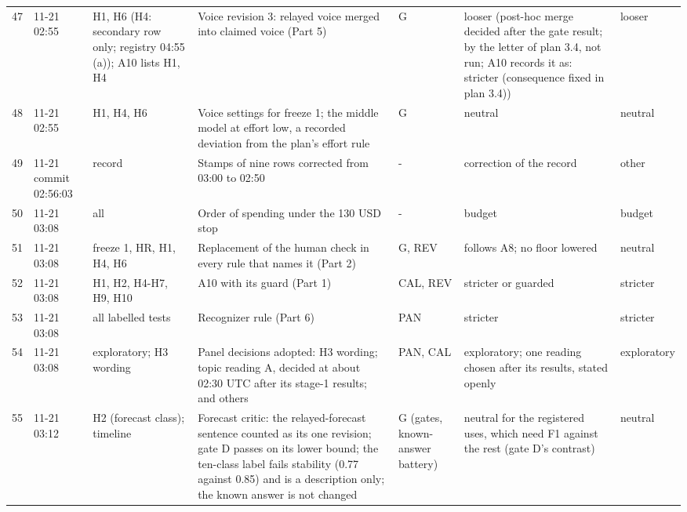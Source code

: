{\begin{tabular}{@{}rp{}p{}p{}p{}p{}l@{}}
47 & 11-21 02:55 & H1, H6 (H4: secondary row only; registry 04:55 (a)); A10 lists H1, H4 & Voice revision 3: relayed voice merged into claimed voice (Part 5) & G & looser (post-hoc merge decided after the gate result; by the letter of plan 3.4, not run; A10 records it as: stricter (consequence fixed in plan 3.4)) & looser \\
48 & 11-21 02:55 & H1, H4, H6 & Voice settings for freeze 1; the middle model at effort low, a recorded deviation from the plan's effort rule & G & neutral & neutral \\
49 & 11-21 commit 02:56:03 & record & Stamps of nine rows corrected from 03:00 to 02:50 & - & correction of the record & other \\
50 & 11-21 03:08 & all & Order of spending under the 130 USD stop & - & budget & budget \\
51 & 11-21 03:08 & freeze 1, HR, H1, H4, H6 & Replacement of the human check in every rule that names it (Part 2) & G, REV & follows A8; no floor lowered & neutral \\
52 & 11-21 03:08 & H1, H2, H4-H7, H9, H10 & A10 with its guard (Part 1) & CAL, REV & stricter or guarded & stricter \\
53 & 11-21 03:08 & all labelled tests & Recognizer rule (Part 6) & PAN & stricter & stricter \\
54 & 11-21 03:08 & exploratory; H3 wording & Panel decisions adopted: H3 wording; topic reading A, decided at about 02:30 UTC after its stage-1 results; and others & PAN, CAL & exploratory; one reading chosen after its results, stated openly & exploratory \\
55 & 11-21 03:12 & H2 (forecast class); timeline & Forecast critic: the relayed-forecast sentence counted as its one revision; gate D passes on its lower bound; the ten-class label fails stability (0.77 against 0.85) and is a description only; the known answer is not changed & G (gates, known-answer battery) & neutral for the registered uses, which need F1 against the rest (gate D's contrast) & neutral \\
\bottomrule
\end{tabular}}
